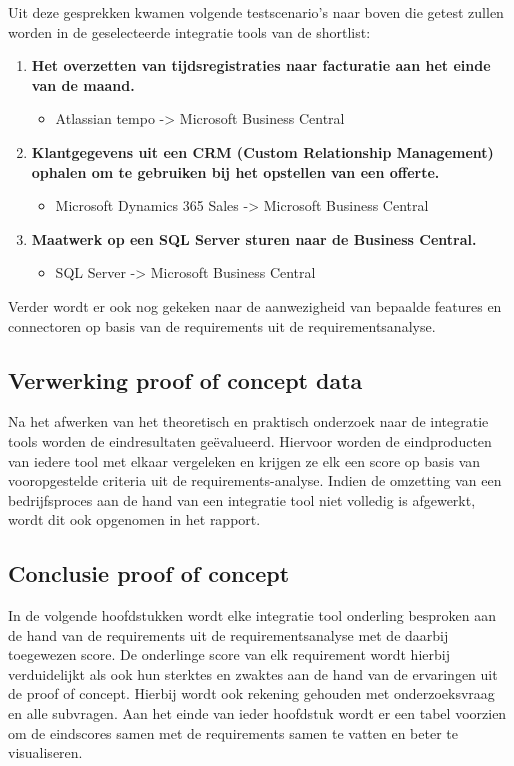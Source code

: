 \vspace{\baselineskip}

Uit deze gesprekken kwamen volgende testscenario’s naar boven die getest zullen worden in de geselecteerde integratie tools van de shortlist:

\begin{enumerate}
    \item \textbf{Het overzetten van tijdsregistraties naar facturatie aan het einde van de maand.}
    \begin{itemize}
        \item Atlassian tempo -> Microsoft Business Central
    \end{itemize}
    \item \textbf{Klantgegevens uit een CRM (Custom Relationship Management) ophalen om te gebruiken bij het opstellen van een offerte.}
    \begin{itemize}
        \item Microsoft Dynamics 365 Sales -> Microsoft Business Central
    \end{itemize}
    \item \textbf{Maatwerk op een SQL Server sturen naar de Business Central.}
    \begin{itemize}
        \item SQL Server -> Microsoft Business Central
    \end{itemize}
\end{enumerate}

Verder wordt er ook nog gekeken naar de aanwezigheid van bepaalde features en connectoren op basis van de requirements uit de requirementsanalyse.

\subsection{Verwerking proof of concept data}
\label{sec:Verwerking proof of concept dataBP}

Na het afwerken van het theoretisch en praktisch onderzoek naar de integratie tools worden de eindresultaten geëvalueerd. Hiervoor worden de eindproducten van iedere tool met elkaar vergeleken en krijgen ze elk een score op basis van vooropgestelde criteria uit de requirements-analyse. Indien de omzetting van een bedrijfsproces aan de hand van een integratie tool niet volledig is afgewerkt, wordt dit ook opgenomen in het rapport.

\subsection{Conclusie proof of concept}
\label{sec:Conclusie proof of conceptBP}

In de volgende hoofdstukken wordt elke integratie tool onderling besproken aan de hand van de requirements uit de requirementsanalyse met de daarbij toegewezen score. De onderlinge score van elk requirement wordt hierbij verduidelijkt als ook hun sterktes en zwaktes aan de hand van de ervaringen uit de proof of concept. Hierbij wordt ook rekening gehouden met onderzoeksvraag en alle subvragen. Aan het einde van ieder hoofdstuk wordt er een tabel voorzien om de eindscores samen met de requirements samen te vatten en beter te visualiseren.

